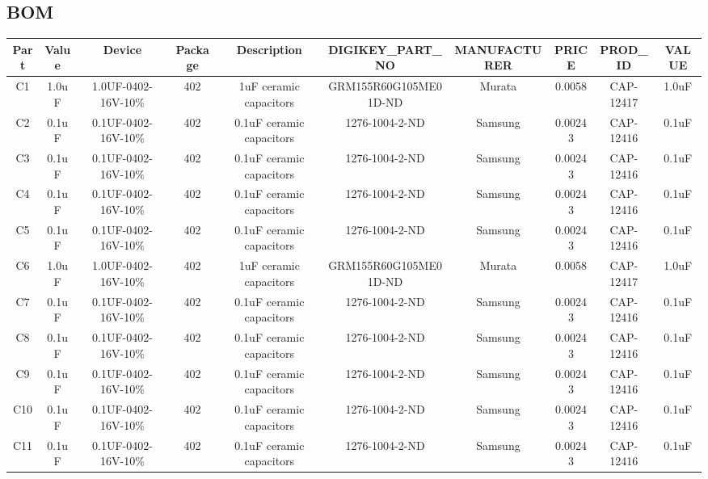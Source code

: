\documentclass[12pt]{article}
\begin{document}
\begin{appendices}

    \section{BOM}
    \begin{table}[htb]
    \begin{adjustbox}{angle=-90, scale=0.35, center}
    \centering
    \begin{tabular}{@{}cccccccccc@{}}
        \toprule
        Part & Value & Device & Package & Description & DIGIKEY\_PART\_NO & MANUFACTURER & PRICE & PROD\_ID & VALUE \\
        \midrule
        C1 & 1.0uF & 1.0UF-0402-16V-10\% & 402 & 1uF ceramic capacitors & GRM155R60G105ME01D-ND & Murata & 0.0058 & CAP-12417 & 1.0uF \\
        C2 & 0.1uF & 0.1UF-0402-16V-10\% & 402 & 0.1uF ceramic capacitors & 1276-1004-2-ND & Samsung & 0.00243 & CAP-12416 & 0.1uF \\
        C3 & 0.1uF & 0.1UF-0402-16V-10\% & 402 & 0.1uF ceramic capacitors & 1276-1004-2-ND & Samsung & 0.00243 & CAP-12416 & 0.1uF \\
        C4 & 0.1uF & 0.1UF-0402-16V-10\% & 402 & 0.1uF ceramic capacitors & 1276-1004-2-ND & Samsung & 0.00243 & CAP-12416 & 0.1uF \\
        C5 & 0.1uF & 0.1UF-0402-16V-10\% & 402 & 0.1uF ceramic capacitors & 1276-1004-2-ND & Samsung & 0.00243 & CAP-12416 & 0.1uF \\
        C6 & 1.0uF & 1.0UF-0402-16V-10\% & 402 & 1uF ceramic capacitors & GRM155R60G105ME01D-ND & Murata & 0.0058 & CAP-12417 & 1.0uF \\
        C7 & 0.1uF & 0.1UF-0402-16V-10\% & 402 & 0.1uF ceramic capacitors & 1276-1004-2-ND & Samsung & 0.00243 & CAP-12416 & 0.1uF \\
        C8 & 0.1uF & 0.1UF-0402-16V-10\% & 402 & 0.1uF ceramic capacitors & 1276-1004-2-ND & Samsung & 0.00243 & CAP-12416 & 0.1uF \\
        C9 & 0.1uF & 0.1UF-0402-16V-10\% & 402 & 0.1uF ceramic capacitors & 1276-1004-2-ND & Samsung & 0.00243 & CAP-12416 & 0.1uF \\
        C10 & 0.1uF & 0.1UF-0402-16V-10\% & 402 & 0.1uF ceramic capacitors & 1276-1004-2-ND & Samsung & 0.00243 & CAP-12416 & 0.1uF \\
        C11 & 0.1uF & 0.1UF-0402-16V-10\% & 402 & 0.1uF ceramic capacitors & 1276-1004-2-ND & Samsung & 0.00243 & CAP-12416 & 0.1uF \\

\end{tabular}
\end{adjustbox}
\end{table}
\end{appendices}
\end{document}
